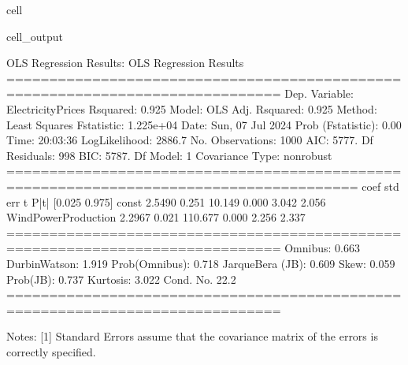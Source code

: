 \documentclass[letterpaper,10pt,english]{jupyterBook}
\begin{document}
\begin{sphinxuseclass}{cell}
\begin{sphinxVerbatimOutput}
\begin{sphinxuseclass}{cell_output}
\begin{sphinxVerbatim}[commandchars=\\\{\}]
OLS Regression Results:
                            OLS Regression Results                            
==============================================================================
Dep. Variable:      ElectricityPrices   R\PYGZhy{}squared:                       0.925
Model:                            OLS   Adj. R\PYGZhy{}squared:                  0.925
Method:                 Least Squares   F\PYGZhy{}statistic:                 1.225e+04
Date:                Sun, 07 Jul 2024   Prob (F\PYGZhy{}statistic):               0.00
Time:                        20:03:36   Log\PYGZhy{}Likelihood:                \PYGZhy{}2886.7
No. Observations:                1000   AIC:                             5777.
Df Residuals:                     998   BIC:                             5787.
Df Model:                           1                                         
Covariance Type:            nonrobust                                         
=======================================================================================
                          coef    std err          t      P\PYGZgt{}|t|      [0.025      0.975]
\PYGZhy{}\PYGZhy{}\PYGZhy{}\PYGZhy{}\PYGZhy{}\PYGZhy{}\PYGZhy{}\PYGZhy{}\PYGZhy{}\PYGZhy{}\PYGZhy{}\PYGZhy{}\PYGZhy{}\PYGZhy{}\PYGZhy{}\PYGZhy{}\PYGZhy{}\PYGZhy{}\PYGZhy{}\PYGZhy{}\PYGZhy{}\PYGZhy{}\PYGZhy{}\PYGZhy{}\PYGZhy{}\PYGZhy{}\PYGZhy{}\PYGZhy{}\PYGZhy{}\PYGZhy{}\PYGZhy{}\PYGZhy{}\PYGZhy{}\PYGZhy{}\PYGZhy{}\PYGZhy{}\PYGZhy{}\PYGZhy{}\PYGZhy{}\PYGZhy{}\PYGZhy{}\PYGZhy{}\PYGZhy{}\PYGZhy{}\PYGZhy{}\PYGZhy{}\PYGZhy{}\PYGZhy{}\PYGZhy{}\PYGZhy{}\PYGZhy{}\PYGZhy{}\PYGZhy{}\PYGZhy{}\PYGZhy{}\PYGZhy{}\PYGZhy{}\PYGZhy{}\PYGZhy{}\PYGZhy{}\PYGZhy{}\PYGZhy{}\PYGZhy{}\PYGZhy{}\PYGZhy{}\PYGZhy{}\PYGZhy{}\PYGZhy{}\PYGZhy{}\PYGZhy{}\PYGZhy{}\PYGZhy{}\PYGZhy{}\PYGZhy{}\PYGZhy{}\PYGZhy{}\PYGZhy{}\PYGZhy{}\PYGZhy{}\PYGZhy{}\PYGZhy{}\PYGZhy{}\PYGZhy{}\PYGZhy{}\PYGZhy{}\PYGZhy{}\PYGZhy{}
const                  \PYGZhy{}2.5490      0.251    \PYGZhy{}10.149      0.000      \PYGZhy{}3.042      \PYGZhy{}2.056
WindPowerProduction     2.2967      0.021    110.677      0.000       2.256       2.337
==============================================================================
Omnibus:                        0.663   Durbin\PYGZhy{}Watson:                   1.919
Prob(Omnibus):                  0.718   Jarque\PYGZhy{}Bera (JB):                0.609
Skew:                          \PYGZhy{}0.059   Prob(JB):                        0.737
Kurtosis:                       3.022   Cond. No.                         22.2
==============================================================================

Notes:
[1] Standard Errors assume that the covariance matrix of the errors is correctly specified.
\end{sphinxVerbatim}

\end{sphinxuseclass}\end{sphinxVerbatimOutput}

\end{sphinxuseclass}
\end{document}
